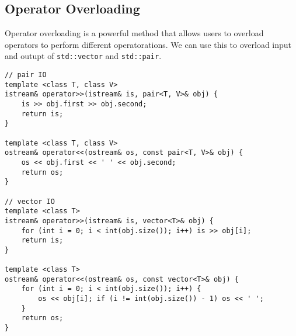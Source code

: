 \subsection{Operator Overloading}

Operator overloading is a powerful method that allows users to overload operators to perform different operatorations. 
We can use this to overload input and outupt of \texttt{std::vector} and \texttt{std::pair}.

\begin{lstlisting}
// pair IO
template <class T, class V>
istream& operator>>(istream& is, pair<T, V>& obj) {
    is >> obj.first >> obj.second;
    return is;
}

template <class T, class V>
ostream& operator<<(ostream& os, const pair<T, V>& obj) {
    os << obj.first << ' ' << obj.second;
    return os;
}

// vector IO
template <class T>
istream& operator>>(istream& is, vector<T>& obj) {
    for (int i = 0; i < int(obj.size()); i++) is >> obj[i];
    return is;
}

template <class T>
ostream& operator<<(ostream& os, const vector<T>& obj) {
    for (int i = 0; i < int(obj.size()); i++) {
        os << obj[i]; if (i != int(obj.size()) - 1) os << ' ';
    }
    return os;
}
\end{lstlisting}